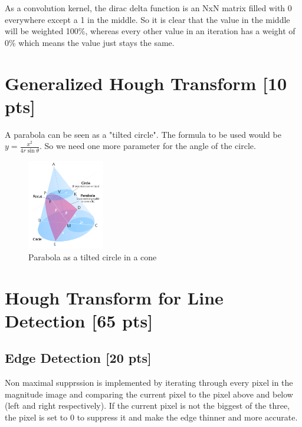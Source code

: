 \documentclass[12pt,a4paper]{article}
\begin{document}
As a convolution kernel, the dirac delta function is an NxN matrix filled with 0 everywhere except a 1 in the middle. So it is clear that the value in the middle will be weighted 100\%, whereas every other value in an iteration has a weight of 0\% which means the value just stays the same.


\section{Generalized Hough Transform [10 pts]}

A parabola can be seen as a "tilted circle". The formula to be used would be $y={\frac {x^{2}}{4r\sin {\theta }}}$.
So we need one more parameter for the angle of the circle.

\begin{figure}[!h]
    \begin{center}
        \includegraphics[width=0.3\textwidth]{assets/parabola.png}
        \caption{Parabola as a tilted circle in a cone}
        \label{fig:parabola}
    \end{center}
\end{figure}


\section{Hough Transform for Line Detection [65 pts]}


\subsection{Edge Detection [20 pts]}
Non maximal supprssion is implemented by iterating through every pixel in the magnitude image and comparing the current pixel to the pixel above and below (left and right respectively). If the current pixel is not the biggest of the three, the pixel is set to 0 to suppress it and make the edge thinner and more accurate.
\end{document}
